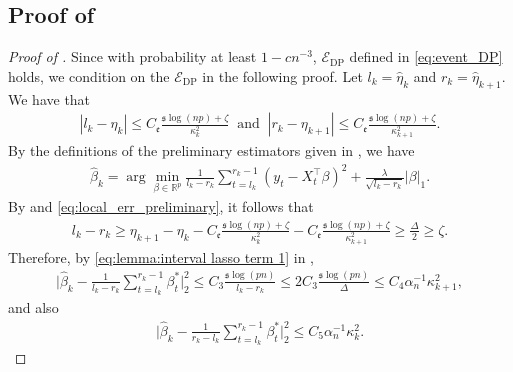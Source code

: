 \documentclass[11pt]{article}
\newcommand{\s}{ { \mathfrak{s}  } }
\theoremstyle{plain}
\theoremstyle{definition}
\begin{document}
\subsection[]{Proof of }
\begin{proof}[Proof of ]
Since with probability at least $1 - cn^{-3}$, $\mathcal{E}_{\mathrm{DP}}$ defined in \eqref{eq:event_DP} holds, we condition on the $\mathcal{E}_{\mathrm{DP}}$ in the following proof. 
Let $l_k = \widehat{\eta}_{k}$ and $r_k = \widehat{\eta}_{k+1}$. We have that
\begin{align}\label{eq:local_err_preliminary}
    |l_k - \eta_{k}| \leq C_{\mathfrak{e}}\frac{\s \log(np) + \zeta}{\kappa_{k}^2} \;\; \text{and} \;\; |r_k - \eta_{k+1}| \leq C_{\mathfrak{e}}\frac{\s \log(np) + \zeta }{\kappa_{k+1}^2}.
\end{align}
By the definitions of the preliminary estimators given in , we have
\begin{align*}
   \widehat  \beta_k  = \arg\min_{\beta \in \mathbb R^p }  \frac{1}{  l_k - r_k }\sum_{t =l_k }^ { r_k-1 }   (y_t  -X_t^\top \beta) ^2 +  \frac{\lambda}{\sqrt {l_k - r_k}  }  |\beta |_1.
\end{align*}
By  and \eqref{eq:local_err_preliminary}, it follows that
\begin{align}\label{eq:interv_leng_preliminary}
    l_k-r_k \geq \eta_{k+1} - \eta_{k} - C_{\mathfrak{e}}\frac{\s \log(np) + \zeta }{\kappa_{k}^2} - C_{\mathfrak{e}}\frac{\s \log(np) + \zeta }{\kappa_{k+1}^2} \geq \frac{\Delta}{2} \geq \zeta.
\end{align}
Therefore, by \eqref{eq:lemma:interval lasso term 1} in ,
\begin{align}\label{eq:lasso_err_preliminary_1}
    \bigg| \widehat \beta_k - \frac{1}{l_k-r_k}\sum_{t = l_k}^{r_k-1}\beta_t^* \bigg|_2^2 \leq C_3\frac{\s\log(pn)}{l_k-r_k} \leq 2C_3\frac{\s\log(pn)}{\Delta} \leq C_4\alpha_n^{-1}\kappa_{k+1}^2,
\end{align}
and also
\begin{align}\label{eq:lasso_err_preliminary_3}
    \bigg| \widehat \beta_k - \frac{1}{r_k-l_k}\sum_{t = l_k}^{r_k-1}\beta_t^* \bigg|_2^2 \leq C_5\alpha_n^{-1}\kappa_{k}^2.
\end{align}

\end{proof}
\end{document}
